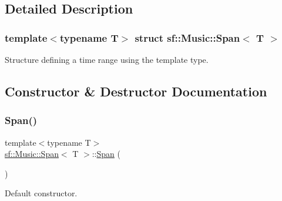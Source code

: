 \subsection{Detailed Description}
\subsubsection*{template$<$typename T$>$\newline
struct sf\+::\+Music\+::\+Span$<$ T $>$}

Structure defining a time range using the template type. 

\begin{DoxyVerb}\end{DoxyVerb}
 

\subsection{Constructor \& Destructor Documentation}
\mbox{\label{structsf_1_1_music_1_1_span_a71e6200a586f650ce002e7e99929ae85}} 
\subsubsection{\texorpdfstring{Span()}{Span()}\hspace{0.1cm}{\footnotesize\ttfamily [1/2]}}
{\footnotesize\ttfamily template$<$typename T$>$ \\
\mbox{\hyperlink{structsf_1_1_music_1_1_span}{sf\+::\+Music\+::\+Span}}$<$ T $>$\+::\mbox{\hyperlink{structsf_1_1_music_1_1_span}{Span}} (\begin{DoxyParamCaption}{ }\end{DoxyParamCaption})\hspace{0.3cm}{\ttfamily [inline]}}



Default constructor. 

\begin{DoxyVerb}\end{DoxyVerb}
 \mbox{\label{structsf_1_1_music_1_1_span_a935db12207fa3da4c2461cd5e1f9fa0d}} 
